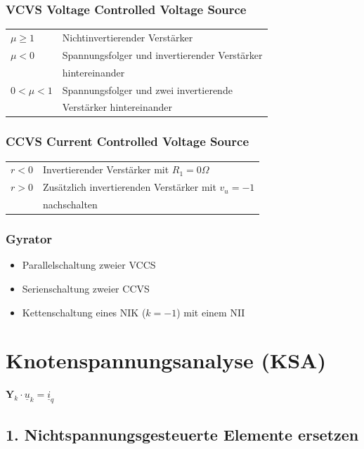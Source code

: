 \documentclass[a4paper,twocolumn,10pt]{article}
\begin{document}
\subsubsection*{VCVS Voltage Controlled Voltage Source}
\begin{tabular}{ll}
$\mu\geq 1$ & Nichtinvertierender Verstärker\\
$\mu<0$ & Spannungsfolger und invertierender Verstärker\\
& hintereinander\\
$0<\mu<1$ & Spannungsfolger und zwei invertierende\\
& Verstärker hintereinander
\end{tabular}

\subsubsection*{CCVS Current Controlled Voltage Source}
\begin{tabular}{ll}
$r<0$ & Invertierender Verstärker mit $R_1=0\Omega$\\
$r>0$ & Zusätzlich invertierenden Verstärker mit $v_u=-1$\\
& nachschalten
\end{tabular}

\subsubsection*{Gyrator}
\begin{itemize}[label=- ,leftmargin=5mm]
	\item Parallelschaltung zweier VCCS
	\item Serienschaltung zweier CCVS
	\item Kettenschaltung eines NIK ($k=-1$) mit einem NII
\end{itemize}

\section*{Knotenspannungsanalyse (KSA)}
$\textbf{Y}_k\cdot \underline{u}_k=\underline{i}_q$

\subsection*{1. Nichtspannungsgesteuerte Elemente ersetzen}
\end{document}
